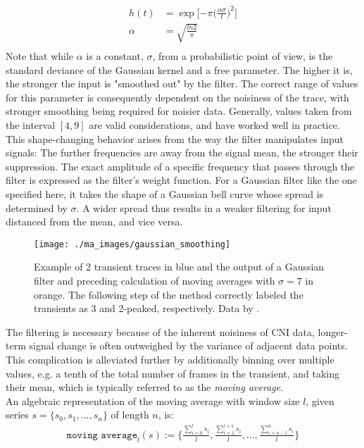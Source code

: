 \documentclass[titlepage]{article}
\begin{document}
\begin{align*}
h(t) &= \exp\lbrack{-\pi (\frac{\alpha\sigma}{t}})^2\rbrack\\
\alpha &= \sqrt{\frac{ln2}{\pi}}\\
\end{align*} 
Note that while $\alpha$ is a constant, $\sigma$, from a probabilistic point of view, is the standard deviance of the Gaussian kernel and a free parameter. The higher it is, the stronger the input is "smoothed out" by the filter. The correct range of values for this parameter is consequently dependent on the noisiness of the trace, with stronger smoothing being required for noisier data. Generally, values taken from the interval $[4,9]$ are valid considerations, and have worked well in practice.\\
This shape-changing behavior arises from the way the filter manipulates input signals: The further frequencies are away from the signal mean, the stronger their suppression. The exact amplitude of a specific frequency that passes through the filter is expressed as the filter's weight function. For a Gaussian filter like the one specified here, it takes the shape of a Gaussian bell curve whose spread is determined by $\sigma$. A wider spread thus results in a weaker filtering for input distanced from the mean, and vice versa.\\
\begin{figure}[h]
\centering
\texttt{[image: ./ma\_images/gaussian\_smoothing]}
\caption{Example of 2 transient traces in blue and the output of a Gaussian filter and preceding calculation of moving averages with $\sigma = 7$ in orange. The following step of the method correctly labeled the transients as 3 and 2-peaked, respectively. Data by \citeauthor{dana_sensitive_2016}\cite{dana_sensitive_2016}.}
\label{fig:gaussian_smoothing}
\end{figure}
The filtering is necessary because of the inherent noisiness of CNI data, longer-term signal change is often outweighed by the variance of adjacent data points. This complication is alleviated further by additionally binning over multiple values, e.g. a tenth of the total number of frames in the transient, and taking their mean, which is typically referred to as the \emph{moving average}.\\
An algebraic representation of the moving average with window size $l$, given series $s = \{s_0,s_1,...,s_n\}$ of length $n$, is:
\begin{align}
\texttt{moving average}_l(s) := \{\frac{\sum_{i=0}^{l}s_i}{l}, \frac{\sum_{i=1}^{l+1}s_i}{l},...,\frac{\sum_{i=n-l}^{n}s_i}{l} \}
\end{align}
\end{document}

